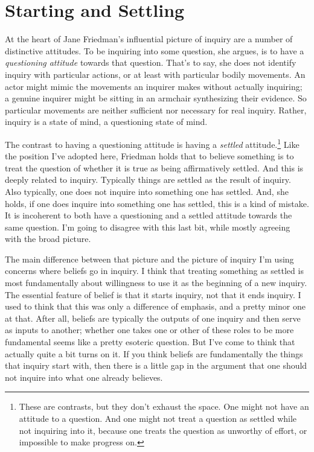 \documentclass[
  11pt,
]{book}
\begin{document}
\hypertarget{settling}{%
\section{Starting and Settling}\label{settling}}

At the heart of Jane Friedman's influential picture of inquiry are a number of distinctive attitudes. \citep{Friedman2017, Friedman2019a, Friedman2019b, Friedman2020} To be inquiring into some question, she argues, is to have a \emph{questioning attitude} towards that question. That's to say, she does not identify inquiry with particular actions, or at least with particular bodily movements. An actor might mimic the movements an inquirer makes without actually inquiring; a genuine inquirer might be sitting in an armchair synthesizing their evidence. So particular movements are neither sufficient nor necessary for real inquiry. Rather, inquiry is a state of mind, a questioning state of mind.

The contrast to having a questioning attitude is having a \emph{settled} attitude.\footnote{These are contrasts, but they don't exhaust the space. One might not have an attitude to a question. And one might not treat a question as settled while not inquiring into it, because one treats the question as unworthy of effort, or impossible to make progress on.} Like the position I've adopted here, Friedman holds that to believe something is to treat the question of whether it is true as being affirmatively settled. And this is deeply related to inquiry. Typically things are settled as the result of inquiry. Also typically, one does not inquire into something one has settled. And, she holds, if one does inquire into something one has settled, this is a kind of mistake. It is incoherent to both have a questioning and a settled attitude towards the same question. I'm going to disagree with this last bit, while mostly agreeing with the broad picture.

The main difference between that picture and the picture of inquiry I'm using concerns where beliefs go in inquiry. I think that treating something as settled is most fundamentally about willingness to use it as the beginning of a new inquiry. The essential feature of belief is that it starts inquiry, not that it ends inquiry. I used to think that this was only a difference of emphasis, and a pretty minor one at that. After all, beliefs are typically the outputs of one inquiry and then serve as inputs to another; whether one takes one or other of these roles to be more fundamental seems like a pretty esoteric question. But I've come to think that actually quite a bit turns on it. If you think beliefs are fundamentally the things that inquiry start with, then there is a little gap in the argument that one should not inquire into what one already believes.
\end{document}

